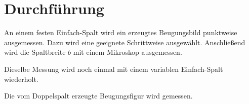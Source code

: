 \section{Durchführung}
\label{sec:Durchführung}

An einem festen Einfach-Spalt wird ein erzeugtes Beugungsbild punktweise ausgemessen. Dazu wird eine geeignete Schrittweise ausgewählt. 
Anschließend wird die Spaltbreite $b$ mit einem Mikroskop ausgemessen. 

Dieselbe Messung wird noch einmal mit einem variablen Einfach-Spalt wiederholt.

Die vom Doppelspalt erzeugte Beugungsfigur wird gemessen. 
